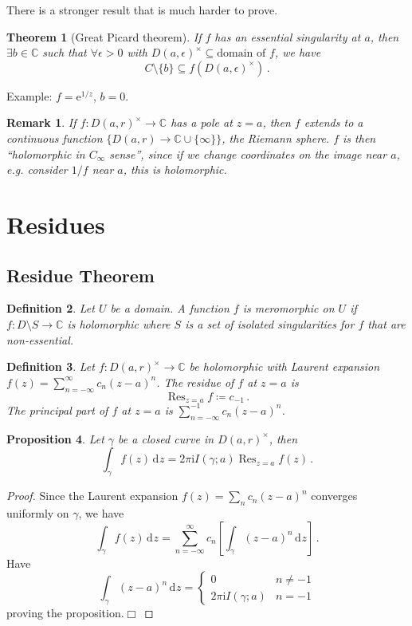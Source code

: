 \documentclass{article}
\theoremstyle{plain}\theoremheaderfont{\normalfont\itshape}\theorembodyfont{\rmfamily}\theoremseparator{.}\newtheorem*{rem}{Remark}\newtheorem*{ex}{Example}\newtheorem*{proof}{Proof}\newtheorem*{altp}{Alternative proof}\newtheorem*{con}{Consequences}\newtheorem*{notn}{Notations}\newtheorem*{cau}{Caution}\newtheorem*{term}{Terminology}\newtheorem*{keyex}{Key example}
\theoremstyle{plain}\theoremheaderfont{\normalfont\bfseries}\theorembodyfont{\rmfamily}\theoremseparator{.}\newtheorem{thm}{Theorem}[section]\newtheorem{lem}[thm]{Lemma}\newtheorem{prop}[thm]{Proposition}\newtheorem*{cor}{Corollary}\newtheorem{defn}[thm]{Definition}\newtheorem{clm}[thm]{Claim}\newtheorem{clminproof}{Claim}\newtheorem{leminproof}{Lemma}\newtheorem{app}{Application}
\theoremstyle{break}\theoremheaderfont{\normalfont\itshape}\theorembodyfont{\rmfamily}\theoremseparator{.\medskip}\newtheorem*{proofskip}{Proof}\newtheorem*{exs}{Examples}\newtheorem*{rems}{Remarks}\newtheorem*{rec}{Recall}\newtheorem*{ppts}{Properties}
\theoremstyle{break}\theoremheaderfont{\normalfont\bfseries}\theorembodyfont{\rmfamily}\theoremseparator{.\medskip}\newtheorem{lemskip}[thm]{Lemma}\newtheorem{defnskip}[thm]{Definition}\newtheorem{propskip}[thm]{Proposition}\newtheorem{thmskip}[thm]{Theorem}
\numberwithin{equation}{section}
\newcommand{\ii}{\mathrm{i}}
\newcommand{\ee}{\mathrm{e}}
\DeclareMathOperator*{\Res}{Res}
\newcommand{\qed}{\hfill\ensuremath{\Box}}
\newcommand{\dd}[2][]{\,\mathrm{d}^{#1} #2}
\newcommand{\CC}{\mathbb{C}}
\begin{document}
    There is a stronger result that is much harder to prove.
    \begin{thm}[Great Picard theorem]
        If \(f\) has an essential singularity at \(a\), then \(\exists b\in\CC\) such that \(\forall\epsilon>0\) with \(D(a,\epsilon)^\times\subseteq\text{domain of }f\), we have
        \[C\setminus\{b\}\subseteq f(D(a,\epsilon)^\times)\,.\]
    \end{thm}
    Example: \(f=\ee^{1/z}\), \(b=0\).
    \begin{rem}
        If \(f:D(a,r)^\times\to\CC\) has a pole at \(z=a\), then \(f\) extends to a continuous function \(\{D(a,r)\to\CC\cup\{\infty\}\}\), the Riemann sphere. \(f\) is then ``holomorphic in \(C_\infty\) sense'', since if we change coordinates on the image near \(a\), e.g. consider \(1/f\) near \(a\), this is holomorphic.
    \end{rem}
    \newpage
    \section{Residues}
    \subsection{Residue Theorem}
    \begin{defn}
        Let \(U\) be a domain. A function \(f\) is \textit{meromorphic} on \(U\) if \(f:D\setminus S\to\CC\) is holomorphic where \(S\) is a set of isolated singularities for \(f\) that are non-essential.
    \end{defn}
    \begin{defn}
        Let \(f:D(a,r)^\times\to\CC\) be holomorphic with Laurent expansion \(f(z)=\sum_{n=-\infty}^{\infty}c_n(z-a)^n\). The \textit{residue} of \(f\) at \(z=a\) is
        \[\Res_{z=a}f\coloneqq c_{-1}\,.\]
        The \textit{principal part} of \(f\) at \(z=a\) is \(\sum_{n=-\infty}^{-1}c_n(z-a)^n\).
    \end{defn}
    \begin{prop}
        Let \(\gamma\) be a closed curve in \(D(a,r)^\times\), then
        \[\int_{\gamma}f(z)\dd{z}=2\pi \ii I(\gamma;a)\Res_{z=a}f(z)\,.\]
    \end{prop}
    \begin{proof}
        Since the Laurent expansion \(f(z)=\sum_{n} c_n(z-a)^n\) converges uniformly on \(\gamma\), we have
        \[\int_\gamma f(z)\dd{z}=\sum_{n=-\infty}^{\infty}c_n\left[\int_{\gamma}(z-a)^n\dd{z}\right]\,.\]
        Have
        \[\int_\gamma(z-a)^n\dd{z}=\begin{cases}
            0 & n\ne -1\\
            2\pi \ii I(\gamma;a) & n=-1
        \end{cases}\]
        proving the proposition.\qed
    \end{proof}
\end{document}
